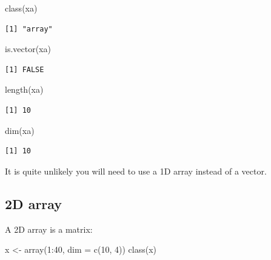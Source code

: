 \documentclass[
]{book}
\newenvironment{Shaded}{\begin{snugshade}}{\end{snugshade}}
\newcommand{\AttributeTok}[1]{\textcolor[rgb]{0.77,0.63,0.00}{#1}}
\newcommand{\DecValTok}[1]{\textcolor[rgb]{0.00,0.00,0.81}{#1}}
\newcommand{\FunctionTok}[1]{\textcolor[rgb]{0.00,0.00,0.00}{#1}}
\newcommand{\NormalTok}[1]{#1}
\newcommand{\OtherTok}[1]{\textcolor[rgb]{0.56,0.35,0.01}{#1}}
\newcommand{\SpecialCharTok}[1]{\textcolor[rgb]{0.00,0.00,0.00}{#1}}
\begin{document}
\begin{Shaded}
\begin{Highlighting}[]
\FunctionTok{class}\NormalTok{(xa)}
\end{Highlighting}
\end{Shaded}

\begin{verbatim}
[1] "array"
\end{verbatim}

\begin{Shaded}
\begin{Highlighting}[]
\FunctionTok{is.vector}\NormalTok{(xa)}
\end{Highlighting}
\end{Shaded}

\begin{verbatim}
[1] FALSE
\end{verbatim}

\begin{Shaded}
\begin{Highlighting}[]
\FunctionTok{length}\NormalTok{(xa)}
\end{Highlighting}
\end{Shaded}

\begin{verbatim}
[1] 10
\end{verbatim}

\begin{Shaded}
\begin{Highlighting}[]
\FunctionTok{dim}\NormalTok{(xa)}
\end{Highlighting}
\end{Shaded}

\begin{verbatim}
[1] 10
\end{verbatim}

It is quite unlikely you will need to use a 1D array instead of a vector.

\hypertarget{d-array-1}{%
\subsection{2D array}\label{d-array-1}}

A 2D array is a matrix:

\begin{Shaded}
\begin{Highlighting}[]
\NormalTok{x }\OtherTok{\textless{}{-}} \FunctionTok{array}\NormalTok{(}\DecValTok{1}\SpecialCharTok{:}\DecValTok{40}\NormalTok{, }\AttributeTok{dim =} \FunctionTok{c}\NormalTok{(}\DecValTok{10}\NormalTok{, }\DecValTok{4}\NormalTok{))}
\FunctionTok{class}\NormalTok{(x)}
\end{Highlighting}
\end{Shaded}
\end{document}
